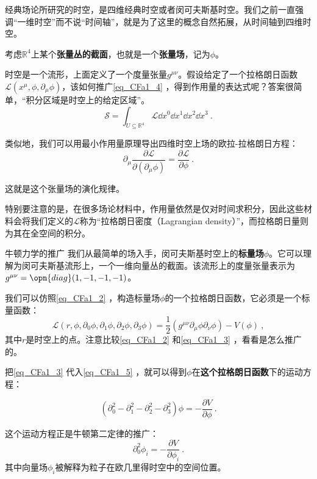 经典场论所研究的时空，是四维经典时空或者闵可夫斯基时空。我们之前一直强调“一维时空”而不说“时间轴”，就是为了这里的概念自然拓展，从时间轴到四维时空。



考虑$\mathbb{R}^4$上某个\textbf{张量丛的截面}，也就是一个\textbf{张量场}，记为$\phi$。

时空是一个流形，上面定义了一个度量张量$g^{\mu\nu}$。假设给定了一个拉格朗日函数$\mathcal{L}(x^\mu, \phi, \partial_\mu\phi)$，该如何推广\autoref{eq_CFa1_4} ，得到作用量的表达式呢？答案很简单，“积分区域是时空上的给定区域”。
\begin{equation}
\mathcal{S} = \int_{U\subseteq \mathbb{R}^4} \mathcal{L}\dd x^0\dd x^1\dd x^2\dd x^3~.
\end{equation}

类似地，我们可以用最小作用量原理导出四维时空上场的欧拉-拉格朗日方程：
\begin{equation}\label{eq_CFa1_5}
\partial_\mu \frac{\partial\mathcal{L}}{\partial(\partial_\mu \phi)} = \frac{\partial\mathcal{L}}{\partial \phi}~.
\end{equation}

这就是这个张量场的演化规律。

特别要注意的是，在很多场论材料中，作用量依然是仅对时间求积分，因此这些材料会将我们定义的$\mathcal{L}$称为“拉格朗日密度（Lagrangian density）”，而拉格朗日量则为其在全空间的积分。

\begin{example}{牛顿力学的推广}\label{ex_CFa1_1}
我们从最简单的场入手，闵可夫斯基时空上的\textbf{标量场}$\phi$。它可以理解为闵可夫斯基流形上，一个一维向量丛的截面。该流形上的度量张量表示为$g^{\mu\nu}=\opn{diag}(1, -1, -1, -1)$。

我们可以仿照\autoref{eq_CFa1_2} ，构造标量场$\phi$的一个拉格朗日函数，它必须是一个标量函数：
\begin{equation}\label{eq_CFa1_3}
\mathcal{L}(r, \phi, \partial_0\phi, \partial_1\phi, \partial_2\phi, \partial_3\phi) = \frac{1}{2}(g^{\mu\nu}\partial_\mu\phi \partial_\nu\phi) - V(\phi)~,
\end{equation}
其中$r$是时空上的点。注意比较\autoref{eq_CFa1_2} 和\autoref{eq_CFa1_3} ，看看是怎么推广的。

把\autoref{eq_CFa1_3} 代入\autoref{eq_CFa1_5} ，就可以得到$\phi$在\textbf{这个拉格朗日函数}下的运动方程：

\begin{equation}
(\partial^2_0-\partial^2_1-\partial^2_2-\partial^2_3)\phi = -\frac{\partial V}{\partial \phi}~.
\end{equation}

这个运动方程正是牛顿第二定律的推广：
\begin{equation}
\partial^2_0 \phi_i = -\frac{\partial V}{\partial \phi_i}~.
\end{equation}
其中向量场$\phi_i$被解释为粒子在欧几里得时空中的空间位置。

\end{example}



